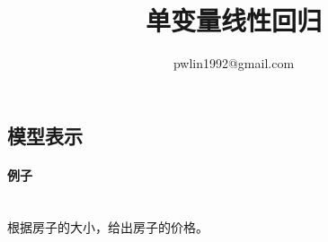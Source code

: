 \documentclass{article}
\title{单变量线性回归}
\author{pwlin1992@gmail.com}
\begin{document}
\maketitle
\tableofcontents
\begin{large}
  \section{模型表示}
  \paragraph{例子}\mbox{} \\
  根据房子的大小，给出房子的价格。
  
\end{large}
\end{document}
